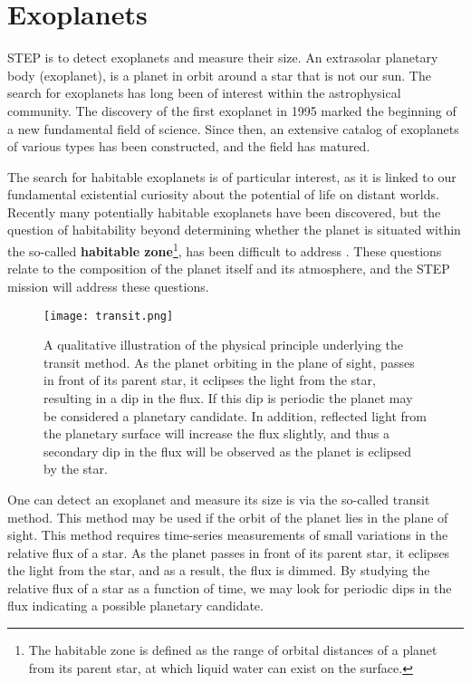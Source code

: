 \documentclass[../main.tex]{subfiles}
\begin{document}
	\section{Exoplanets}
	STEP is to detect exoplanets and measure their size. An extrasolar planetary body (exoplanet), is a planet in orbit around a star that is not our sun. The search for exoplanets has long been of interest within the astrophysical community. The discovery of the first exoplanet in 1995 \cite{firstexoplanet} marked the beginning of a new fundamental field of science. Since then, an extensive catalog of exoplanets of various types has been constructed, and the field has matured. 
	
	The search for habitable exoplanets is of particular interest, as it is linked to our fundamental existential curiosity about the potential of life on distant worlds. Recently many potentially habitable exoplanets have been discovered, but the question of habitability beyond determining whether the planet is situated within the so-called \textbf{habitable zone}\footnote{The habitable zone is defined as the range of orbital distances of a planet from its parent star, at which liquid water can exist on the surface\cite{habitablezone}.}, has been difficult to address \cite{stepprodex}. 
	These questions relate to the composition of the planet itself and its atmosphere, and the STEP mission will address these questions. 
	\begin{figure}[hb!]
		\centering			
		\texttt{[image: transit.png]}
		\caption{A qualitative illustration \cite{naturetransitfig} of the physical principle underlying the transit method. As the planet orbiting in the plane of sight, passes in front of its parent star, it eclipses the light from the star, resulting in a dip in the flux. If this dip is periodic the planet may be considered a planetary candidate. In addition, reflected light from the planetary surface will increase the flux slightly, and thus a secondary dip in the flux will be observed as the planet is eclipsed by the star. }
		\label{fig:transitmethod}
	\end{figure}
	One can detect an exoplanet and measure its size is via the so-called transit method. This method may be used if the orbit of the planet lies in the plane of sight. This method requires time-series measurements of small variations in the relative flux of a star. As the planet passes in front of its parent star, it eclipses the light from the star, and as a result, the flux is dimmed. By studying the relative flux of a star as a function of time, we may look for periodic dips in the flux indicating a possible planetary candidate. 
	
\end{document}
